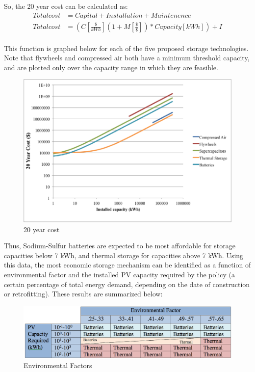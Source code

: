 So, the 20 year cost can be calculated as:
\begin{equation}
\begin{aligned}
Total cost&=Capital+Installation+Maintenence\\
Total cost&=(C[\frac{\$}{kWh}](1+M[\frac{\$}{\$}])*Capacity[kWh])+I\\
\end{aligned}
\end{equation}

This function is graphed below for each of the five proposed storage
technologies. Note that flywheels and compressed air both have a minimum
threshold capacity, and are plotted only over the capacity range in which they
are feasible.

\begin{figure}
\begin{center}
\includegraphics[scale=0.6]{pics/PatrickFigure5.png}
\caption{20 year cost}
\label{p5}
\end{center}
\end{figure}

Thus, Sodium-Sulfur batteries are expected to be most affordable for storage
capacities below 7 kWh, and thermal storage for capacities above 7 kWh. Using
this data, the most economic storage mechanism can be identified as a function
of environmental factor and the installed PV capacity required by the policy (a
certain percentage of total energy demand, depending on the date of
construction or retrofitting). These results are summarized below:

\begin{figure}
\begin{center}
\includegraphics[scale=0.3]{pics/PatrickTable1.png}
\caption{Environmental Factors}
\label{patrickTable1}
\end{center}
\end{figure}

